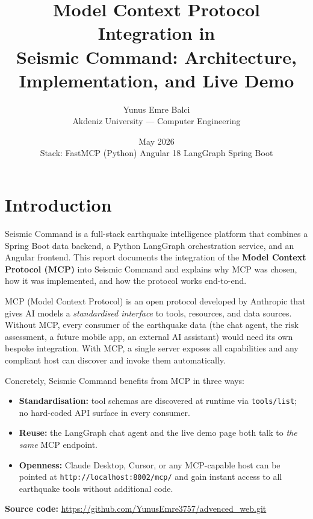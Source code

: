 \documentclass[11pt,a4paper]{article}
\title{\textbf{Model Context Protocol Integration in\\Seismic Command: Architecture, Implementation, and Live Demo}}
\author{Yunus Emre Balci \\ Akdeniz University --- Computer Engineering}
\date{May 2026 \\[0.3em]\small
Stack: FastMCP (Python) \textbullet{} Angular 18 \textbullet{} LangGraph \textbullet{} Spring Boot}
\begin{document}
\maketitle
\thispagestyle{fancy}
\tableofcontents
\newpage

\section{Introduction}

Seismic Command is a full-stack earthquake intelligence platform that combines a
Spring Boot data backend, a Python LangGraph orchestration service, and an Angular
frontend. This report documents the integration of the \textbf{Model Context
Protocol (MCP)} into Seismic Command and explains why MCP was chosen, how it was
implemented, and how the protocol works end-to-end.

\begin{rationale}
MCP (Model Context Protocol) is an open protocol developed by Anthropic that gives
AI models a \textit{standardised interface} to tools, resources, and data sources.
Without MCP, every consumer of the earthquake data (the chat agent, the risk
assessment, a future mobile app, an external AI assistant) would need its own
bespoke integration. With MCP, a single server exposes all capabilities and any
compliant host can discover and invoke them automatically.

Concretely, Seismic Command benefits from MCP in three ways:
\begin{itemize}[leftmargin=1.2em]
    \item \textbf{Standardisation:} tool schemas are discovered at runtime via
          \texttt{tools/list}; no hard-coded API surface in every consumer.
    \item \textbf{Reuse:} the LangGraph chat agent and the live demo page both
          talk to \emph{the same} MCP endpoint.
    \item \textbf{Openness:} Claude Desktop, Cursor, or any MCP-capable host can
          be pointed at \texttt{http://localhost:8002/mcp/} and gain instant
          access to all earthquake tools without additional code.
\end{itemize}
\end{rationale}

\noindent\textbf{Source code:} \url{https://github.com/YunusEmre3757/advenced_web.git}
\end{document}
